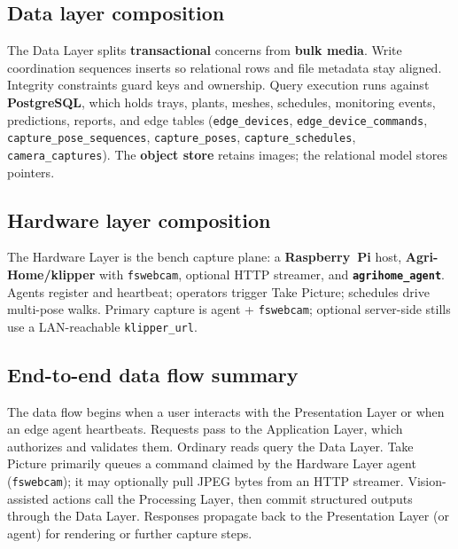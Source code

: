 \subsection{Data layer composition}

The Data Layer splits \textbf{transactional} concerns from \textbf{bulk media}. Write coordination sequences inserts so relational rows and file metadata stay aligned. Integrity constraints guard keys and ownership. Query execution runs against \textbf{PostgreSQL}, which holds trays, plants, meshes, schedules, monitoring events, predictions, reports, and edge tables (\texttt{edge\_devices}, \texttt{edge\_device\_commands}, \texttt{capture\_pose\_sequences}, \texttt{capture\_poses}, \texttt{capture\_schedules}, \texttt{camera\_captures}). The \textbf{object store} retains images; the relational model stores pointers.

\subsection{Hardware layer composition}

The Hardware Layer is the bench capture plane: a \textbf{Raspberry~Pi} host, \textbf{Agri-Home/klipper} with \texttt{fswebcam}, optional HTTP streamer, and \textbf{\texttt{agrihome\_agent}}. Agents register and heartbeat; operators trigger Take Picture; schedules drive multi-pose walks. Primary capture is agent + \texttt{fswebcam}; optional server-side stills use a LAN-reachable \texttt{klipper\_url}.

\subsection{End-to-end data flow summary}

The data flow begins when a user interacts with the Presentation Layer or when an edge agent heartbeats. Requests pass to the Application Layer, which authorizes and validates them. Ordinary reads query the Data Layer. Take Picture primarily queues a command claimed by the Hardware Layer agent (\texttt{fswebcam}); it may optionally pull JPEG bytes from an HTTP streamer. Vision-assisted actions call the Processing Layer, then commit structured outputs through the Data Layer. Responses propagate back to the Presentation Layer (or agent) for rendering or further capture steps.
